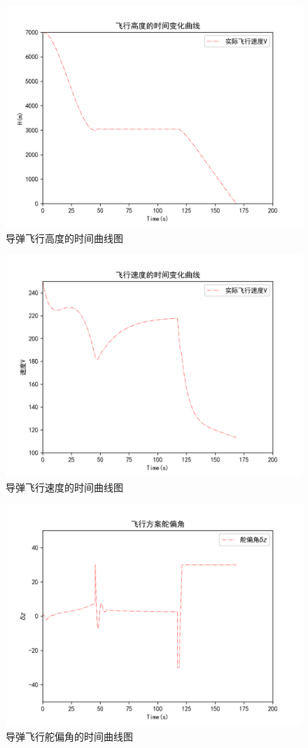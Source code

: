 \documentclass[UTF8]{ctexart}
\begin{document}
\begin{figure}[H]
    \centering
    \includegraphics[width=130mm]{../img/飞行高度.png}
    \caption{导弹飞行高度的时间曲线图}
\end{figure}
\begin{figure}[H]
    \centering
    \includegraphics[width=130mm]{../img/飞行速度.png}
    \caption{导弹飞行速度的时间曲线图}
\end{figure}
\begin{figure}[H]
    \centering
    \includegraphics[width=130mm]{../img/飞行舵偏角.png}
    \caption{导弹飞行舵偏角的时间曲线图}
\end{figure}
\end{document}
